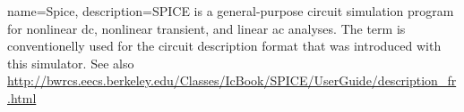 {
    name=Spice,
	description={SPICE is a general-purpose circuit simulation program for
	nonlinear dc, nonlinear transient, and linear ac analyses. The term is
	conventionelly used for the circuit description format that was introduced
	with this simulator. See also
		\url{http://bwrcs.eecs.berkeley.edu/Classes/IcBook/SPICE/UserGuide/description_fr.html}}
}
